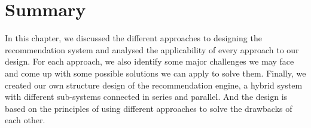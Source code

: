 \section{Summary}
In this chapter, we discussed the different approaches to designing the recommendation system and analysed the applicability of every approach to our design. For each approach, we also identify some major challenges we may face and come up with some possible solutions we can apply to solve them. Finally, we created our own structure design of the recommendation engine, a hybrid system with different sub-systems connected in series and parallel. And the design is based on the principles of using different approaches to solve the drawbacks of each other.


